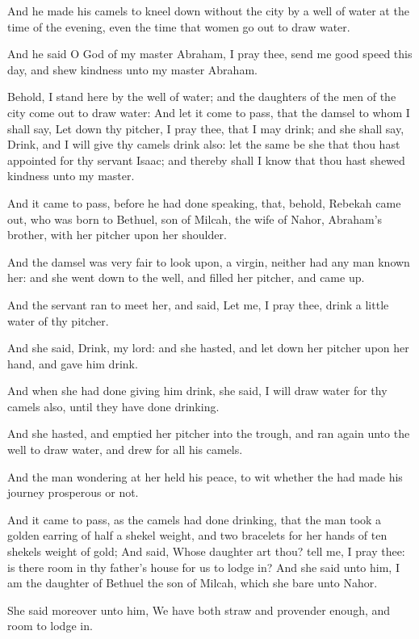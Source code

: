 \verse And he made his camels to kneel down without the city by a well
of water at the time of the evening, even the time that women go out
to draw water.

\verse And he said O \LORD God of my master Abraham, I pray thee, send
me good speed this day, and shew kindness unto my master Abraham.

\verse Behold, I stand here by the well of water; and the daughters of
the men of the city come out to draw water: \verse And let it come to
pass, that the damsel to whom I shall say, Let down thy pitcher, I
pray thee, that I may drink; and she shall say, Drink, and I will give
thy camels drink also: let the same be she that thou hast appointed
for thy servant Isaac; and thereby shall I know that thou hast shewed
kindness unto my master.

\verse And it came to pass, before he had done speaking, that, behold,
Rebekah came out, who was born to Bethuel, son of Milcah, the wife of
Nahor, Abraham's brother, with her pitcher upon her shoulder.

\verse And the damsel was very fair to look upon, a virgin, neither had
any man known her: and she went down to the well, and filled her
pitcher, and came up.

\verse And the servant ran to meet her, and said, Let me, I pray thee,
drink a little water of thy pitcher.

\verse And she said, Drink, my lord: and she hasted, and let down her
pitcher upon her hand, and gave him drink.

\verse And when she had done giving him drink, she said, I will draw
water for thy camels also, until they have done drinking.

\verse And she hasted, and emptied her pitcher into the trough, and ran
again unto the well to draw water, and drew for all his camels.

\verse And the man wondering at her held his peace, to wit whether the
\LORD had made his journey prosperous or not.

\verse And it came to pass, as the camels had done drinking, that the
man took a golden earring of half a shekel weight, and two bracelets
for her hands of ten shekels weight of gold; \verse And said, Whose
daughter art thou? tell me, I pray thee: is there room in thy father's
house for us to lodge in?  \verse And she said unto him, I am the
daughter of Bethuel the son of Milcah, which she bare unto Nahor.

\verse She said moreover unto him, We have both straw and provender
enough, and room to lodge in.

